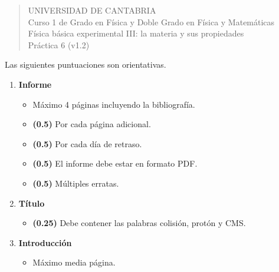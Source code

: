 \documentclass[11pt]{articulo}
\begin{document}
\begin{verse}
{\Large UNIVERSIDAD DE CANTABRIA}\\ 
\vspace*{0.5cm}
{\normalsize \rm Curso 1 de Grado en F\'isica y Doble Grado en F\'isica y Matem\'aticas}\\
{\normalsize \rm F\'isica b\'asica experimental III: la materia y sus propiedades}\\ 
{\normalsize \rm Pr\'actica 6 (v1.2)}\\
\end{verse} 

\vspace*{0.25cm}

Las siguientes puntuaciones son orientativas.

\begin{enumerate}

\item {\bf Informe}

\begin{itemize}

\item M\'aximo 4 p\'aginas incluyendo la bibliograf\'ia.

\item {\bf (0.5)} Por cada p\'agina adicional.

\item {\bf (0.5)} Por cada d\'ia de retraso.

\item {\bf (0.5)} El informe debe estar en formato PDF.

\item {\bf (0.5)} M\'ultiples erratas.

\end{itemize}

\item {\bf T\'itulo}

\begin{itemize}

\item {\bf (0.25)} Debe contener las palabras colisi\'on, prot\'on y CMS.

\end{itemize}

\item {\bf Introducci\'on}

\begin{itemize}

\item M\'aximo media p\'agina.


\end{itemize}
\end{enumerate}
\end{document}
